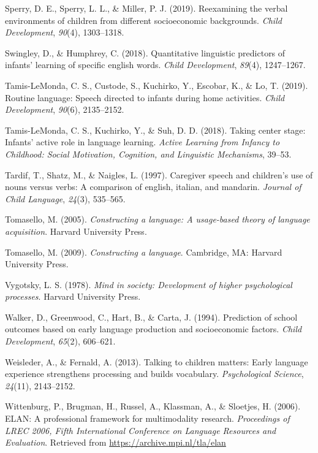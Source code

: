 \documentclass[
  man,floatsintext]{apa6}
\newlength{\cslhangindent}
\newlength{\cslentryspacingunit} %
\newenvironment{CSLReferences}[2] %
 {%
  \setlength{\parindent}{0pt}
  \ifodd #1
  \let\oldpar\par
  \def\par{\hangindent=\cslhangindent\oldpar}
  \fi
  \setlength{\parskip}{#2\cslentryspacingunit}
 }%
 {}
\begin{document}
\begin{CSLReferences}{1}{0}
\leavevmode{}%
Sperry, D. E., Sperry, L. L., \& Miller, P. J. (2019). Reexamining the verbal environments of children from different socioeconomic backgrounds. \emph{Child Development}, \emph{90}(4), 1303--1318.

\leavevmode{}%
Swingley, D., \& Humphrey, C. (2018). Quantitative linguistic predictors of infants' learning of specific english words. \emph{Child Development}, \emph{89}(4), 1247--1267.

\leavevmode{}%
Tamis-LeMonda, C. S., Custode, S., Kuchirko, Y., Escobar, K., \& Lo, T. (2019). Routine language: Speech directed to infants during home activities. \emph{Child Development}, \emph{90}(6), 2135--2152.

\leavevmode{}%
Tamis-LeMonda, C. S., Kuchirko, Y., \& Suh, D. D. (2018). Taking center stage: Infants' active role in language learning. \emph{Active Learning from Infancy to Childhood: Social Motivation, Cognition, and Linguistic Mechanisms}, 39--53.

\leavevmode{}%
Tardif, T., Shatz, M., \& Naigles, L. (1997). Caregiver speech and children's use of nouns versus verbs: A comparison of english, italian, and mandarin. \emph{Journal of Child Language}, \emph{24}(3), 535--565.

\leavevmode{}%
Tomasello, M. (2005). \emph{Constructing a language: A usage-based theory of language acquisition}. Harvard University Press.

\leavevmode{}%
Tomasello, M. (2009). \emph{Constructing a language}. Cambridge, MA: Harvard University Press.

\leavevmode{}%
Vygotsky, L. S. (1978). \emph{Mind in society: Development of higher psychological processes}. Harvard University Press.

\leavevmode{}%
Walker, D., Greenwood, C., Hart, B., \& Carta, J. (1994). Prediction of school outcomes based on early language production and socioeconomic factors. \emph{Child Development}, \emph{65}(2), 606--621.

\leavevmode{}%
Weisleder, A., \& Fernald, A. (2013). Talking to children matters: Early language experience strengthens processing and builds vocabulary. \emph{Psychological Science}, \emph{24}(11), 2143--2152.

\leavevmode{}%
Wittenburg, P., Brugman, H., Russel, A., Klassman, A., \& Sloetjes, H. (2006). {ELAN}: {A} professional framework for multimodality research. \emph{Proceedings of LREC 2006, Fifth International Conference on Language Resources and Evaluation}. Retrieved from \url{https://archive.mpi.nl/tla/elan}

\end{CSLReferences}
\end{document}
